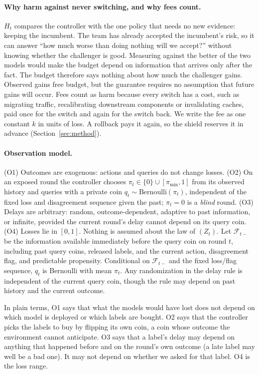 \documentclass[10pt]{article}
\theoremstyle{plain}
\theoremstyle{definition}
\begin{document}
\paragraph{Why harm against never switching, and why fees count.}
$H_t$ compares the controller with the one policy that needs no new evidence: keeping the incumbent. The team has already accepted the incumbent's risk, so it can answer ``how much worse than doing nothing will we accept?'' without knowing whether the challenger is good. Measuring against the better of the two models would make the budget depend on information that arrives only after the fact. The budget therefore says nothing about how much the challenger gains. Observed gains free budget, but the guarantee requires no assumption that future gains will occur. Fees count as harm because every switch has a cost, such as migrating traffic, recalibrating downstream components or invalidating caches, paid once for the switch and again for the switch back. We write the fee as one constant $k$ in units of loss. A rollback pays it again, so the shield reserves it in advance (Section~\ref{sec:method}).

\paragraph{Observation model.}
(O1) Outcomes are exogenous: actions and queries do not change losses. (O2) On an exposed round the controller chooses $\pi_t\in\{0\}\cup[\pi_{\min},1]$ from its observed history and queries with a private coin $q_t\sim\mathrm{Bernoulli}(\pi_t)$, independent of the fixed loss and disagreement sequence given the past; $\pi_t=0$ is a \emph{blind} round. (O3) Delays are arbitrary: random, outcome-dependent, adaptive to past information, or infinite, provided the current round's delay cannot depend on its query coin. (O4) Losses lie in $[0,1]$. Nothing is assumed about the law of $(Z_t)$. Let $\mathcal F_{t-}$ be the information available immediately before the query coin on round $t$, including past query coins, released labels, and the current action, disagreement flag, and predictable propensity. Conditional on $\mathcal F_{t-}$ and the fixed loss/flag sequence, $q_t$ is Bernoulli with mean $\pi_t$. Any randomization in the delay rule is independent of the current query coin, though the rule may depend on past history and the current outcome.

In plain terms, O1 says that what the models would have lost does not depend on which model is deployed or which labels are bought. O2 says that the controller picks the labels to buy by flipping its own coin, a coin whose outcome the environment cannot anticipate. O3 says that a label's delay may depend on anything that happened before and on the round's own outcome (a late label may well be a bad one). It may not depend on whether we asked for that label. O4 is the loss range.
\end{document}
